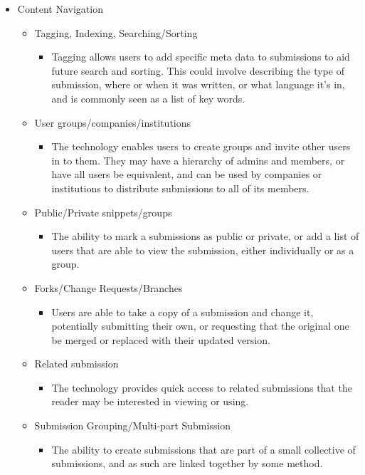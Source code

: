 \begin{itemize}
	\item Content Navigation
	\begin{itemize}
		\item Tagging, Indexing, Searching/Sorting
		\begin{itemize}
			\item Tagging allows users to add specific meta data to submissions to aid future search and sorting. This could involve describing the type of submission, where or when it was written, or what language it's in, and is commonly seen as a list of key words. 
		\end{itemize}
		\item User groups/companies/institutions
		\begin{itemize}
			\item The technology enables users to create groups and invite other users in to them. They may have a hierarchy of admins and members, or have all users be equivalent, and can be used by companies or institutions to distribute submissions to all of its members.
		\end{itemize}
		\item Public/Private snippets/groups
		\begin{itemize}
			\item The ability to mark a submissions as public or private, or add a list of users that are able to view the submission, either individually or as a group.
		\end{itemize}
		\item Forks/Change Requests/Branches
		\begin{itemize}
			\item Users are able to take a copy of a submission and change it, potentially submitting their own, or requesting that the original one be merged or replaced with their updated version.
		\end{itemize}
		\item Related submission
		\begin{itemize}
			\item The technology provides quick access to related submissions that the reader may be interested in viewing or using.
		\end{itemize}
		\item Submission Grouping/Multi-part Submission
		\begin{itemize}
			\item The ability to create submissions that are part of a small collective of submissions, and as such are linked together by some method.

\end{itemize}
\end{itemize}
\end{itemize}
